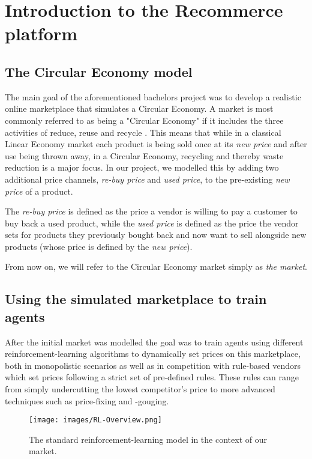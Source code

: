 \section{Introduction to the Recommerce platform}

\subsection{The Circular Economy model}\label{subsection:CircularEconomy}
The main goal of the aforementioned bachelors project was to develop a realistic online marketplace that simulates
a Circular Economy. A market is most commonly referred to as being a "Circular Economy" if it includes the three
activities of reduce, reuse and recycle \cite{circularEconomyDefinition}. This means that while in a classical
Linear Economy market each product is being sold once at its \emph{new price} and after use being thrown away,
in a Circular Economy, recycling and thereby waste reduction is a major focus. In our project, we modelled this by
adding two additional price channels, \emph{re-buy price} and \emph{used price}, to the pre-existing \emph{new price} of a product.

The \emph{re-buy price} is defined as the price a vendor is willing to pay a customer to buy back a used product, while the
\emph{used price} is defined as the price the vendor sets for products they previously bought back and now want to sell alongside new products
(whose price is defined by the \emph{new price}).

From now on, we will refer to the Circular Economy market simply as \emph{the market}.

\subsection{Using the simulated marketplace to train agents}\label{subsection:ReinforcementLearningIntroduction}

After the initial market was modelled the goal was to train agents using different reinforcement-learning algorithms
to dynamically set prices on this marketplace, both in monopolistic scenarios as well as in competition with rule-based vendors
which set prices following a strict set of pre-defined rules. These rules can range from simply undercutting the
lowest competitor's price to more advanced techniques such as price-fixing and -gouging.

\begin{figure}[hbt!]
	\centering
	\texttt{[image: images/RL-Overview.png]}\\[1 ex]
	\caption{The standard reinforcement-learning model in the context of our market.}
	\label{fig:IntroRLDiagram}
\end{figure}

